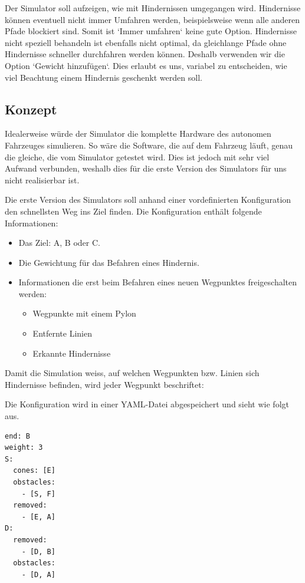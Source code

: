 \documentclass[../main.tex]{subfiles}
\begin{document}
Der Simulator soll aufzeigen, wie mit Hindernissen umgegangen wird.
Hindernisse können eventuell nicht immer Umfahren werden, beispielsweise wenn alle anderen Pfade blockiert sind. Somit ist `Immer umfahren` keine gute Option. Hindernisse nicht speziell behandeln ist ebenfalls nicht optimal, da gleichlange Pfade ohne Hindernisse schneller durchfahren werden können. Deshalb verwenden wir die Option `Gewicht hinzufügen`. Dies erlaubt es uns, variabel zu entscheiden, wie viel Beachtung einem Hindernis geschenkt werden soll.

\subsection{Konzept}

Idealerweise würde der Simulator die komplette Hardware des autonomen Fahrzeuges simulieren. So wäre die Software, die auf dem Fahrzeug läuft, genau die gleiche, die vom Simulator getestet wird. Dies ist jedoch mit sehr viel Aufwand verbunden, weshalb dies für die erste Version des Simulators für uns nicht realisierbar ist.

Die erste Version des Simulators soll anhand einer vordefinierten Konfiguration den schnellsten Weg ins Ziel finden. Die Konfiguration enthält folgende Informationen:
\begin{itemize}
    \item Das Ziel: A, B oder C.
    \item Die Gewichtung für das Befahren eines Hindernis.
    \item Informationen die erst beim Befahren eines neuen Wegpunktes freigeschalten werden:
     \begin{itemize}
        \item{Wegpunkte mit einem Pylon}
        \item{Entfernte Linien}
        \item{Erkannte Hindernisse}
   \end{itemize}
\end{itemize}


Damit die Simulation weiss, auf welchen Wegpunkten bzw. Linien sich Hindernisse befinden, wird jeder Wegpunkt beschriftet:


Die Konfiguration wird in einer YAML-Datei abgespeichert und sieht wie folgt aus.

\begin{verbatim}
end: B
weight: 3
S:
  cones: [E]
  obstacles: 
    - [S, F] 
  removed:
    - [E, A]
D:
  removed:
    - [D, B]
  obstacles:
    - [D, A]
\end{verbatim}
\end{document}
